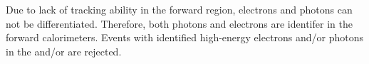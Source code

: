 Due to lack of tracking ability in the forward region, electrons and photons can not be differentiated. Therefore, both photons and electrons are identifer in the forward calorimeters. Events with identified high-energy electrons and/or photons in the \BeamCAL and/or \LumiCAL are rejected.


